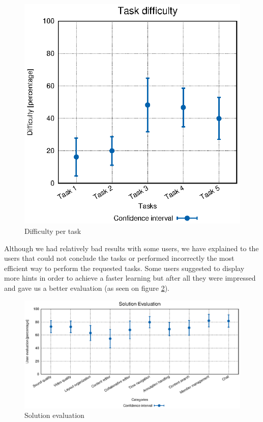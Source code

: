 \begin{figure}
\begin{minipage}{.5\textwidth}
    \includegraphics[width=\textwidth]{stats/user_diffs.eps}
  \caption{Difficulty per task}
  \label{fig:user_diffs}
\end{minipage}
\end{figure}


Although we had relatively bad results with some users, we have explained to the users that could not conclude the tasks or performed incorrectly the most efficient way to perform the requested tasks. Some users suggested to display more hints in order to achieve a faster learning but after all they were impressed and gave us a better evaluation (as seen on figure \ref{fig:user_evals}).

\begin{figure}
  \centering
  \includegraphics[width=\textwidth]{stats/user_evals.eps}
  \caption{Solution evaluation}
  \label{fig:user_evals}
\end{figure}



